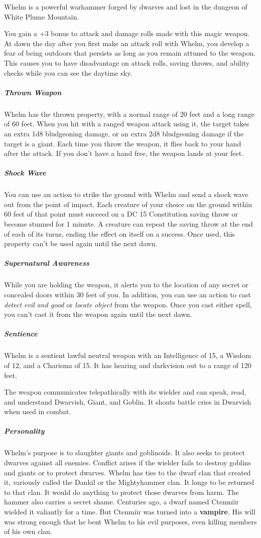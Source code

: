 \documentclass[10pt,a4paper,twoside,bg=print,twocolumn,openany,nodeprecatedcode]{dndbook}
\begin{document}
Whelm is a powerful warhammer forged by dwarves and lost in the dungeon of White Plume Mountain.

You gain a +3 bonus to attack and damage rolls made with this magic weapon. At dawn the day after you first make an attack roll with Whelm, you develop a fear of being outdoors that persists as long as you remain attuned to the weapon. This causes you to have disadvantage on attack rolls, saving throws, and ability checks while you can see the daytime sky.

\subparagraph{Thrown Weapon}
Whelm has the thrown property, with a normal range of 20 feet and a long range of 60 feet. When you hit with a ranged weapon attack using it, the target takes an extra 1d8 bludgeoning damage, or an extra 2d8 bludgeoning damage if the target is a giant. Each time you throw the weapon, it flies back to your hand after the attack. If you don't have a hand free, the weapon lands at your feet.

\subparagraph{Shock Wave}
You can use an action to strike the ground with Whelm and send a shock wave out from the point of impact. Each creature of your choice on the ground within 60 feet of that point must succeed on a DC 15 Constitution saving throw or become stunned for 1 minute. A creature can repeat the saving throw at the end of each of its turns, ending the effect on itself on a success. Once used, this property can't be used again until the next dawn.

\subparagraph{Supernatural Awareness}
While you are holding the weapon, it alerts you to the location of any secret or concealed doors within 30 feet of you. In addition, you can use an action to cast \textit{detect evil and good} or \textit{locate object} from the weapon. Once you cast either spell, you can't cast it from the weapon again until the next dawn.

\subparagraph{Sentience}
Whelm is a sentient lawful neutral weapon with an Intelligence of 15, a Wisdom of 12, and a Charisma of 15. It has hearing and darkvision out to a range of 120 feet.

The weapon communicates telepathically with its wielder and can speak, read, and understand Dwarvish, Giant, and Goblin. It shouts battle cries in Dwarvish when used in combat.

\subparagraph{Personality}
Whelm's purpose is to slaughter giants and goblinoids. It also seeks to protect dwarves against all enemies. Conflict arises if the wielder fails to destroy goblins and giants or to protect dwarves. Whelm has ties to the dwarf clan that created it, variously called the Dankil or the Mightyhammer clan. It longs to be returned to that clan. It would do anything to protect those dwarves from harm. The hammer also carries a secret shame. Centuries ago, a dwarf named Ctenmiir wielded it valiantly for a time. But Ctenmiir was turned into a \textbf{vampire}. His will was strong enough that he bent Whelm to his evil purposes, even killing members of his own clan.
\end{document}

